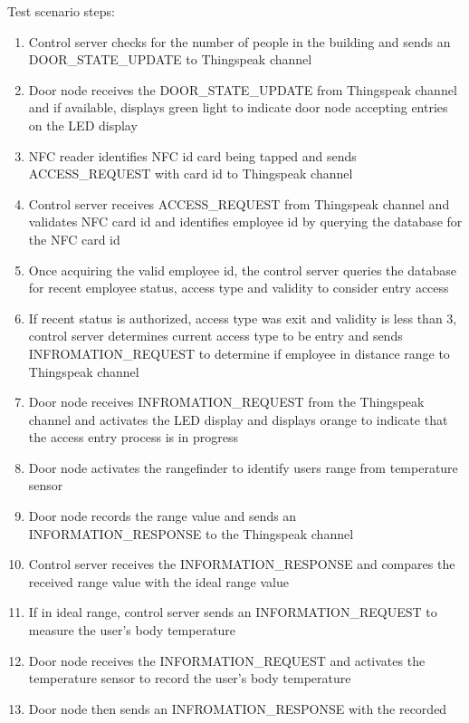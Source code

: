 \noindent
Test scenario steps:
\begin{enumerate}
    \item Control server checks for the number of people in the building and 
          sends an DOOR\_STATE\_UPDATE to Thingspeak channel
    \item Door node receives the DOOR\_STATE\_UPDATE from Thingspeak channel and 
          if available, displays green light to indicate door node accepting 
          entries on the LED display
    \item NFC reader identifies NFC id card being tapped and sends 
          ACCESS\_REQUEST with card id to Thingspeak channel
    \item Control server receives ACCESS\_REQUEST from Thingspeak channel and 
          validates NFC card id and identifies employee id by querying the 
          database for the NFC card id 
    \item Once acquiring the valid employee id, the control server queries the 
          database for recent employee status, access type and validity to 
          consider entry access
    \item If recent status is authorized, access type was exit and validity is
          less than 3, control server determines current access type to be 
          entry and sends INFROMATION\_REQUEST to determine if employee in 
          distance range to Thingspeak channel
    \item Door node receives INFROMATION\_REQUEST from the Thingspeak channel
          and activates the LED display and displays orange to indicate that the
          access entry process is in progress 
    \item Door node activates the rangefinder to identify users range from
          temperature sensor
    \item Door node records the range value and sends an INFORMATION\_RESPONSE
          to the Thingspeak channel
    \item Control server receives the INFORMATION\_RESPONSE and compares the
          received range value with the ideal range value
    \item If in ideal range, control server sends an INFORMATION\_REQUEST to
          measure the user’s body temperature
    \item Door node receives the INFORMATION\_REQUEST and activates the 
          temperature sensor to record the user’s body temperature 
    \item Door node then sends an INFROMATION\_RESPONSE with the recorded

\end{enumerate}
